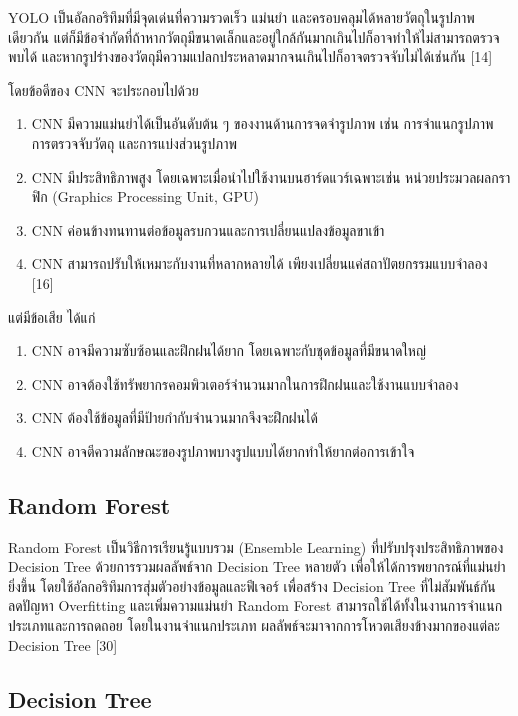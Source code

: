 \documentclass[12pt,oneside,openright,a4paper]{cpe-thai-project}
\begin{document}
\begin{enumerate}
\hspace{2em}YOLO เป็นอัลกอริทึมที่มีจุดเด่นที่ความรวดเร็ว แม่นยำ และครอบคลุมได้หลายวัตถุในรูปภาพเดียวกัน แต่ก็มีข้อจำกัดที่ถ้าหากวัตถุมีขนาดเล็กและอยู่ใกล้กันมากเกินไปก็อาจทำให้ไม่สามารถตรวจพบได้ และหากรูปร่างของวัตถุมีความแปลกประหลาดมากจนเกินไปก็อาจตรวจจับไม่ได้เช่นกัน [14] 
\end{enumerate}

โดยข้อดีของ CNN จะประกอบไปด้วย
\begin{enumerate}
\item CNN มีความแม่นยำได้เป็นอันดับต้น ๆ ของงานด้านการจดจำรูปภาพ เช่น การจำแนกรูปภาพ การตรวจจับวัตถุ และการแบ่งส่วนรูปภาพ
\item CNN มีประสิทธิภาพสูง โดยเฉพาะเมื่อนำไปใช้งานบนฮาร์ดแวร์เฉพาะเช่น หน่วยประมวลผลกราฟิก (Graphics Processing Unit, GPU)
\item CNN ค่อนข้างทนทานต่อข้อมูลรบกวนและการเปลี่ยนแปลงข้อมูลขาเข้า
\item CNN สามารถปรับให้เหมาะกับงานที่หลากหลายได้ เพียงเปลี่ยนแค่สถาปัตยกรรมแบบจำลอง [16]
\end{enumerate}

แต่มีข้อเสีย ได้แก่

\begin{enumerate}
\item CNN อาจมีความซับซ้อนและฝึกฝนได้ยาก โดยเฉพาะกับชุดข้อมูลที่มีขนาดใหญ่
\item CNN อาจต้องใช้ทรัพยากรคอมพิวเตอร์จำนวนมากในการฝึกฝนและใช้งานแบบจำลอง
\item CNN ต้องใช้ข้อมูลที่มีป้ายกำกับจำนวนมากจึงจะฝึกฝนได้
\item CNN อาจตีความลักษณะของรูปภาพบางรูปแบบได้ยากทำให้ยากต่อการเข้าใจ
\end{enumerate}

\subsection{Random Forest}

\hspace{2em}Random Forest เป็นวิธีการเรียนรู้แบบรวม (Ensemble Learning) ที่ปรับปรุงประสิทธิภาพของ Decision Tree ด้วยการรวมผลลัพธ์จาก Decision Tree หลายตัว เพื่อให้ได้การพยากรณ์ที่แม่นยำยิ่งขึ้น โดยใช้อัลกอริทึมการสุ่มตัวอย่างข้อมูลและฟีเจอร์ เพื่อสร้าง Decision Tree ที่ไม่สัมพันธ์กัน ลดปัญหา Overfitting และเพิ่มความแม่นยำ Random Forest สามารถใช้ได้ทั้งในงานการจำแนกประเภทและการถดถอย โดยในงานจำแนกประเภท ผลลัพธ์จะมาจากการโหวตเสียงข้างมากของแต่ละ Decision Tree [30]

\subsection{Decision Tree}
\end{document}
